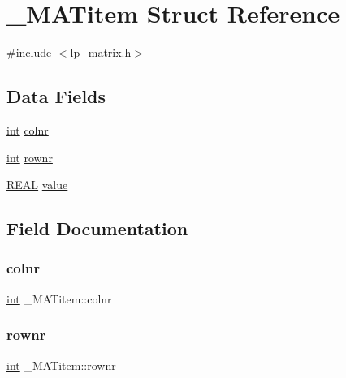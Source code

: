 \hypertarget{struct___m_a_titem}{}\section{\+\_\+\+M\+A\+Titem Struct Reference}
\label{struct___m_a_titem}


{\ttfamily \#include $<$lp\+\_\+matrix.\+h$>$}

\subsection*{Data Fields}
\begin{DoxyCompactItemize}
\item 
\hyperlink{lp__lib_8h_adeb9ec6400320e4923ac9d836d509ddb}{int} \hyperlink{struct___m_a_titem_a0f9749c98ff4be4834d551e1d8fb7de3}{colnr}
\item 
\hyperlink{lp__lib_8h_adeb9ec6400320e4923ac9d836d509ddb}{int} \hyperlink{struct___m_a_titem_a987e596edb79cf70bb8b4cf904ed5de1}{rownr}
\item 
\hyperlink{lp__lib_8h_a92bd5e363d131fa73669358edb232dce}{R\+E\+AL} \hyperlink{struct___m_a_titem_aef0935a83fa966f9ab3e71b8a4bf2814}{value}
\end{DoxyCompactItemize}


\subsection{Field Documentation}
\mbox{\label{struct___m_a_titem_a0f9749c98ff4be4834d551e1d8fb7de3}} 
\subsubsection{\texorpdfstring{colnr}{colnr}}
{\footnotesize\ttfamily \hyperlink{lp__lib_8h_adeb9ec6400320e4923ac9d836d509ddb}{int} \+\_\+\+M\+A\+Titem\+::colnr}

\mbox{\label{struct___m_a_titem_a987e596edb79cf70bb8b4cf904ed5de1}} 
\subsubsection{\texorpdfstring{rownr}{rownr}}
{\footnotesize\ttfamily \hyperlink{lp__lib_8h_adeb9ec6400320e4923ac9d836d509ddb}{int} \+\_\+\+M\+A\+Titem\+::rownr}

